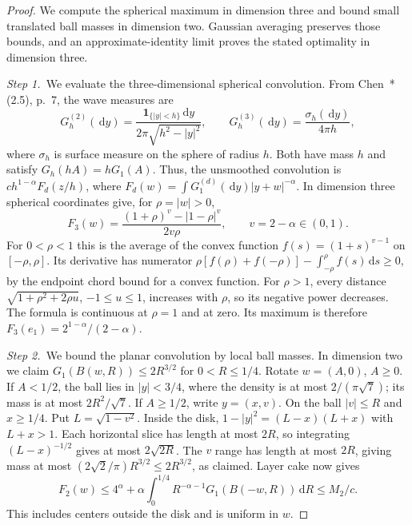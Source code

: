 \documentclass[12pt,oneside,openany]{book}
\numberwithin{equation}{section}
\theoremstyle{nogostyle}
\theoremstyle{definition}
\newcommand{\ud}{\,\mathrm{d}}
\begin{document}
\begin{proof}
  We compute the spherical maximum in dimension three and bound small
  translated ball masses in dimension two. Gaussian averaging preserves those
  bounds, and an approximate-identity limit proves the stated optimality in
  dimension three.


  \medskip
  \noindent\textit{Step 1.~}We evaluate the three-dimensional spherical
  convolution.
  From Chen~\cite{chen:author2026:time-dependency}*{(2.5), p.~7}, the wave
  measures are
  \[
    G_h^{(2)}(\ud y)=\frac{\mathbf1_{\{|y|<h\}}\ud y}
    {2\pi\sqrt{h^2-|y|^2}},\qquad
    G_h^{(3)}(\ud y)=\frac{\sigma_h(\ud y)}{4\pi h},
  \]
  where $\sigma_h$ is surface measure on the sphere of radius $h$. Both have
  mass $h$ and satisfy $G_h(hA) = hG_1(A)$. Thus, the unsmoothed convolution is
  $ch^{1-\alpha}F_d(z/h)$, where $F_d(w) = \int G_1^{(d)}(\ud
  y)|y+w|^{-\alpha}$. In dimension three spherical coordinates give, for $\rho =
  |w| > 0$,
  \[
    F_3(w)=\frac{(1+\rho)^v-|1-\rho|^v}{2v\rho},
    \qquad v=2-\alpha\in(0,1).
  \]
  For $0 < \rho < 1$ this is the average of the convex function $f(s) =
  (1+s)^{v-1}$ on $[-\rho,\rho]$. Its derivative has numerator
  $\rho[f(\rho)+f(-\rho)]-\int_{-\rho}^\rho f(s)\ud s \ge 0$, by the endpoint
  chord bound for a convex function. For $\rho > 1$, every distance
  $\sqrt{1+\rho^2+2\rho u}$, $-1 \le u \le 1$, increases with $\rho$, so its
  negative power decreases. The formula is continuous at $\rho = 1$ and at zero.
  Its maximum is therefore $F_3(e_1) = 2^{1-\alpha}/(2-\alpha)$.


  \medskip
  \noindent\textit{Step 2.~}We bound the planar convolution by local ball
  masses.
  In dimension two we claim $G_1(B(w,R)) \le 2R^{3/2}$ for $0 < R \le 1/4$.
  Rotate $w = (A,0)$, $A \ge 0$. If $A < 1/2$, the ball lies in $|y| < 3/4$,
  where the density is at most $2/(\pi\sqrt7)$; its mass is at most
  $2R^2/\sqrt7$. If $A \ge 1/2$, write $y = (x,v)$. On the ball $|v| \le R$ and
  $x \ge 1/4$. Put $L = \sqrt{1-v^2}$. Inside the disk, $1-|y|^2 = (L-x)(L+x)$
  with $L+x > 1$. Each horizontal slice has length at most $2R$, so integrating
  $(L-x)^{-1/2}$ gives at most $2\sqrt{2R}$. The $v$ range has length at most
  $2R$, giving mass at most $(2\sqrt2/\pi)R^{3/2} \le 2R^{3/2}$, as claimed.
  Layer cake now gives
  \[
    F_2(w)\le4^\alpha+
    \alpha\int_0^{1/4}R^{-\alpha-1}G_1(B(-w,R))\ud R
    \le M_2/c.
  \]
  This includes centers outside the disk and is uniform in $w$.



\end{proof}
\end{document}
